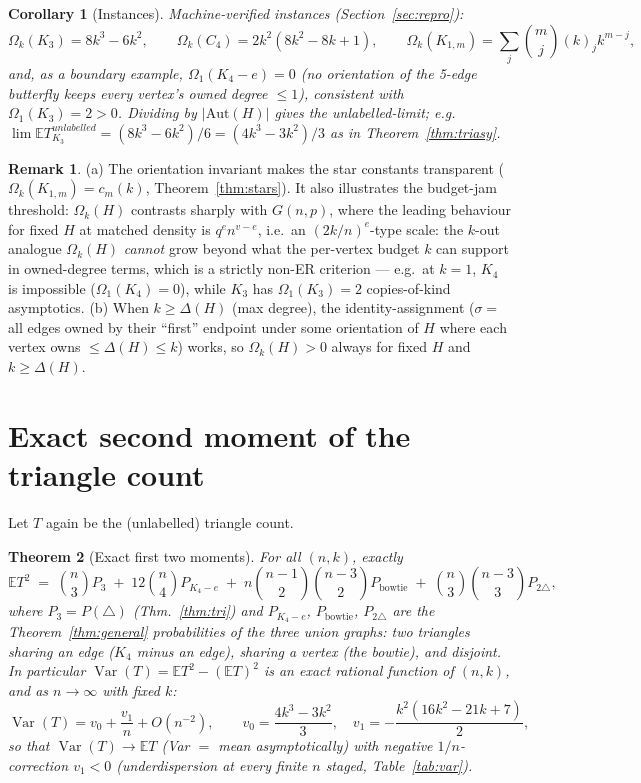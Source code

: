 \documentclass[11pt,a4paper]{article}
\newtheorem{theorem}{Theorem}[section]
\newtheorem{corollary}[theorem]{Corollary}
\theoremstyle{definition}
\newtheorem*{remark}{Remark}
\theoremstyle{definition}
\begin{document}
\begin{corollary}[Instances]\label{cor:omega}
Machine-verified instances (Section~\ref{sec:repro}):
\[
\Omega_k(K_3) = 8k^{3}-6k^{2},\qquad
\Omega_k(C_4) = 2k^{2}(8k^{2}-8k+1),\qquad
\Omega_k(K_{1,m}) = \sum_{j}\binom{m}{j}(k)_{j}k^{m-j},
\]
and, as a boundary example, $\Omega_1(K_4-e)=0$ (no orientation of the 5-edge
butterfly keeps every vertex's owned degree $\le1$), consistent with
$\Omega_1(K_3)=2>0$. Dividing by $|\mathrm{Aut}(H)|$ gives the unlabelled-limit;
e.g.\ $\lim \mathbb E T_{K_3}^{unlabelled} = (8k^3-6k^2)/6=(4k^3-3k^2)/3$ as in
Theorem~\ref{thm:triasy}.
\end{corollary}

\begin{remark}
(a) The orientation invariant makes the star constants transparent
($\Omega_k(K_{1,m}) = c_m(k)$, Theorem~\ref{thm:stars}). It also illustrates the
budget-jam threshold: $\Omega_k(H)$ contrasts sharply with $G(n,p)$, where the
leading behaviour for fixed $H$ at matched density is $q^{e}n^{v-e}$, i.e.\ an
$(2k/n)^{e}$-type scale: the $k$-out analogue $\Omega_k(H)$ \emph{cannot} grow
beyond what the per-vertex budget $k$ can support in owned-degree terms, which is a
strictly non-ER criterion — e.g.\ at $k=1$, $K_4$ is impossible ($\Omega_1(K_4)=0$),
while $K_3$ has $\Omega_1(K_3)=2$ copies-of-kind asymptotics.
(b) When $k \geq \Delta(H)$ (max degree), the identity-assignment ($\sigma = $ all
edges owned by their ``first'' endpoint under some orientation of $H$ where each
vertex owns $\le \Delta(H)\le k$) works, so $\Omega_k(H)>0$ always for fixed
$H$ and $k\ge \Delta(H)$.
\end{remark}

\section{Exact second moment of the triangle count}\label{sec:variance}

Let $T$ again be the (unlabelled) triangle count.

\begin{theorem}[Exact first two moments]\label{thm:variance}
For all $(n,k)$, exactly
\[
\mathbb E T^{2} \;=\; \binom{n}{3}P_3 \;+\; 12\binom{n}{4}P_{K_4-e} \;+\;
n\binom{n-1}{2}\binom{n-3}{2}P_{\text{bowtie}}\;+\;
\binom{n}{3}\binom{n-3}{3}P_{2\triangle},
\]
where $P_3 = P(\triangle)$ (Thm.~\ref{thm:tri}) and $P_{K_4-e}$, $P_{\text{bowtie}}$,
$P_{2\triangle}$ are the Theorem~\ref{thm:general} probabilities of the three
\emph{union graphs}: two triangles sharing an edge ($K_4$ minus an edge), sharing a
vertex (the bowtie), and disjoint. In particular $\operatorname{Var}(T) = \mathbb
E T^{2} - (\mathbb ET)^{2}$ is an exact rational function of $(n,k)$, and as
$n\to\infty$ with fixed $k$:
\[
\operatorname{Var}(T) = v_0+\frac{v_1}{n}+O(n^{-2}),\qquad
v_0=\frac{4k^{3}-3k^{2}}{3},\quad
v_1=-\frac{k^{2}(16k^{2}-21k+7)}{2},
\]
so that $\operatorname{Var}(T)\to \mathbb E T$ (Var $=$ mean asymptotically) with
negative $1/n$-correction $v_1 <0$ (underdispersion at every finite $n$ staged,
Table~\ref{tab:var}).
\end{theorem}
\end{document}

